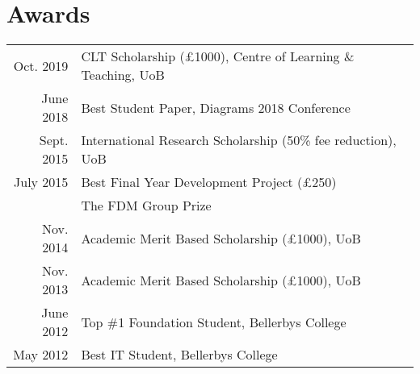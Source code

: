 \documentclass[a4paper,11pt]{article} %
\begin{document}





\section{Awards}

\begin{tabular}{rl}

Oct. 2019 & CLT Scholarship (£1000), Centre of Learning \& Teaching, UoB\\

June 2018 & Best Student Paper, Diagrams 2018 Conference\\

Sept. 2015 & International Research Scholarship (50\% fee reduction), UoB\\

July 2015 & Best Final Year Development Project (£250)\\ &The FDM Group Prize \\

Nov. 2014 & Academic Merit Based Scholarship (£1000), UoB \\

Nov. 2013 & Academic Merit Based Scholarship (£1000), UoB \\

June 2012 & Top \#1 Foundation Student, Bellerbys College \\

May 2012 & Best IT Student, Bellerbys College \\

\end{tabular}
\end{document}
